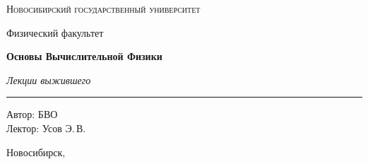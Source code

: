 \documentclass[12pt,a4paper]{report}
\begin{document}
\hypersetup{pageanchor=false}
\begin{titlepage}
    \thispagestyle{empty}

    \begin{center}
        \vspace*{1.5cm}

        {\Large\scshape Новосибирский государственный университет\par}
        \vspace{0.25cm}
        {\large Физический факультет\par}

        \vfill

        {\Huge\bfseries Основы Вычислительной Физики\par}

        \vspace{0.45cm}

        {\Large\itshape Лекции выжившего\par}

        \vspace{0.8cm}

        \rule{0.72\linewidth}{0 pt}





        \vfill

        \begin{flushright}
            \large
            Автор: БВО\\[0.25cm]
            Лектор: Усов Э.\,В.
        \end{flushright}

        \vspace{1.2cm}

        {\large Новосибирск, \the\year}

    \end{center}
\end{titlepage}
\hypersetup{pageanchor=true}

\tableofcontents
\newpage



\clearpage

\clearpage

\clearpage

\clearpage


\clearpage

\clearpage

\clearpage

\clearpage
\end{document}
